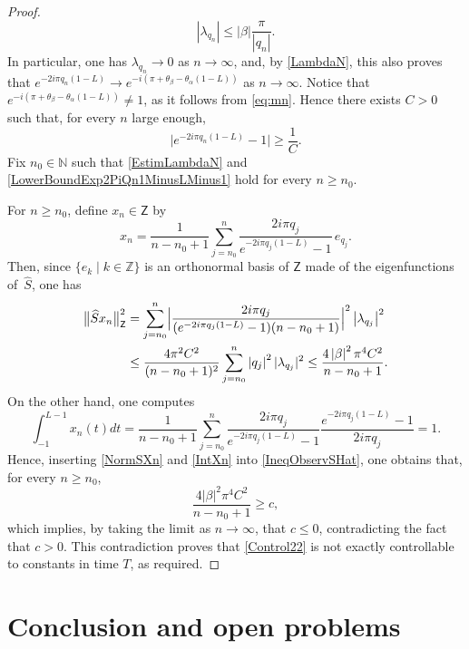 \documentclass[10pt]{amsart}
\theoremstyle{plain}
\theoremstyle{definition}
\newcommand{\abs}[1]{\left\lvert #1\right \rvert}
\newcommand{\bnorm}[1]{\bigl\lVert #1\bigr\lVert}
\newcommand{\babs}[1]{\bigl\lvert #1\bigr \rvert}
\newcommand{\Babs}[1]{\Bigl\lvert #1\Bigr \rvert}
\newcommand{\nabs}[1]{\lvert #1 \rvert}
\begin{document}
\begin{proof}
\begin{equation}
\abs{\lambda_{q_n}} \leq \abs{\beta} \frac{\pi}{\abs{q_n}}.
\end{equation}
In particular, one has $\lambda_{q_n} \to 0$ as $n \to \infty$, and, by \eqref{LambdaN}, this also proves that $e^{- 2 i \pi q_n (1 - L)} \to e^{-i(\pi + \theta_\beta - \theta_\alpha(1 - L))}$ as $n \to \infty$. Notice that $e^{-i(\pi + \theta_\beta - \theta_\alpha(1 - L))} \neq 1$, as it follows from \eqref{eq:mn}. Hence there exists $C > 0$ such that, for every $n$ large enough,
\begin{equation}
\label{LowerBoundExp2PiQn1MinusLMinus1}
\babs{e^{- 2 i \pi q_n (1 - L)} - 1} \geq \frac{1}{C}.
\end{equation}
Fix $n_0 \in \mathbb N$ such that \eqref{EstimLambdaN} and \eqref{LowerBoundExp2PiQn1MinusLMinus1} hold for every $n \geq n_0$.

For $n \geq n_0$, define $x_n \in \mathsf Z$ by
\[
x_n = \frac{1}{n - n_0 + 1} \sum_{j = n_0}^n \frac{2 i \pi q_j}{e^{- 2 i \pi q_j (1 - L)} - 1}\, e_{q_j}.
\]
Then, since $\{e_k \mid k \in \mathbb Z\}$ is an orthonormal basis of $\mathsf Z$ made of the eigenfunctions of~$\widehat S$, one has
\begin{equation}
\label{NormSXn}
\begin{aligned}
\bnorm{\widehat S x_n}_{\mathsf Z}^2 & = \sum_{j = n_0}^n \Babs{\frac{2 i \pi q_j}{(e^{- 2 i \pi q_j (1 - L)} - 1)(n - n_0 + 1)}}^2 \abs{\lambda_{q_j}}^2 \\
& \leq \frac{4 \pi^2 C^2}{(n - n_0 + 1)^2} \sum_{j = n_0}^n \abs{q_j}^2 \nabs{\lambda_{q_j}}^2 \leq \frac{4 \abs{\beta}^2 \pi^4 C^2}{n - n_0 + 1}.
\end{aligned}
\end{equation}
On the other hand, one computes
\begin{equation}
\label{IntXn}
\int_{-1}^{L - 1} x_n(t) dt = \frac{1}{n - n_0 + 1} \sum_{j = n_0}^n \frac{2 i \pi q_j}{e^{- 2 i \pi q_j (1 - L)} - 1} \frac{e^{- 2 i \pi q_j (1 - L)} - 1}{2 i \pi q_j} = 1.
\end{equation}
Hence, inserting \eqref{NormSXn} and \eqref{IntXn} into \eqref{IneqObservSHat}, one obtains that, for every $n \geq n_0$,
\[
\frac{4 \abs{\beta}^2 \pi^4 C^2}{n - n_0 + 1} \geq c,
\]
which implies, by taking the limit as $n \to \infty$, that $c \leq 0$, contradicting the fact that $c > 0$. This contradiction proves that \eqref{Control22} is not exactly controllable to constants in time $T$, as required.
\end{proof}

\section{Conclusion and open problems}
\end{document}
